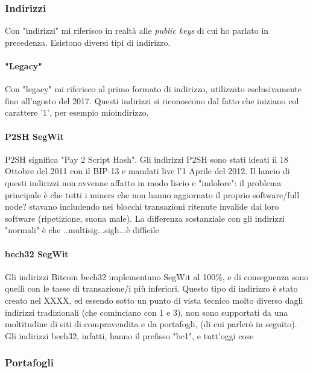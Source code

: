 \documentclass {article}
\begin{document}
\subsubsection {Indirizzi} %


Con "indirizzi" mi riferisco in realtà alle \textit{public keys} di cui ho parlato in precedenza.
Esistono diversi tipi di indirizzo.


\paragraph {"Legacy"}


Con "legacy" mi riferisco al primo formato di indirizzo, utilizzato esclusivamente fino all'agosto del 2017.
Questi indirizzi si riconoscono dal fatto che iniziano col carattere '1', per esempio mioindirizzo.


\paragraph {P2SH SegWit}


P2SH significa "Pay 2 Script Hash".
Gli indirizzi P2SH sono stati ideati il 18 Ottobre del 2011 con il BIP-13 e mandati live l'1 Aprile del 2012.
Il lancio di questi indirizzi non avvenne affatto in modo liscio e "indolore": il problema principale è che tutti i miners che non hanno aggiornato il proprio software/full node? stavano includendo nei blocchi transazioni ritenute invalide dai loro software (ripetizione, suona male).
La differenza sostanziale con gli indirizzi "normali" è che ..multisig...sigh...è difficile


\paragraph {bech32 SegWit}


Gli indirizzi Bitcoin bech32 implementano SegWit al 100\%, e di conseguenza sono quelli con le tasse di transazione/i più inferiori.
Questo tipo di indirizzo è stato creato nel XXXX, ed essendo sotto un punto di vista tecnico molto diverso dagli indirizzi tradizionali (che cominciano con 1 e 3), non sono supportati da una moltitudine di siti di compravendita e da portafogli, (di cui parlerò in seguito).
Gli indirizzi bech32, infatti, hanno il prefisso "bc1", e tutt'oggi cose


\subsubsection {Portafogli}
\end{document}
